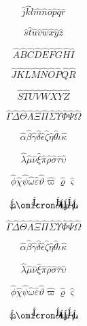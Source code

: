 $$
\hat{j} 
\hat{k} 
\hat{l} 
\hat{m} 
\hat{n} 
\hat{o} 
\hat{p} 
\hat{q} 
\hat{r} 
$$

$$
\hat{s} 
\hat{t} 
\hat{u} 
\hat{v} 
\hat{w} 
\hat{x} 
\hat{y} 
\hat{z} 
$$

$$
\hat{A} 
\hat{B} 
\hat{C} 
\hat{D} 
\hat{E} 
\hat{F} 
\hat{G} 
\hat{H} 
\hat{I} 
$$

$$
\hat{J} 
\hat{K} 
\hat{L} 
\hat{M} 
\hat{N} 
\hat{O} 
\hat{P} 
\hat{Q} 
\hat{R} 
$$

$$
\hat{S} 
\hat{T} 
\hat{U} 
\hat{V} 
\hat{W} 
\hat{X} 
\hat{Y} 
\hat{Z} 
$$



$$
\hat{\varGamma} 
\hat{\varDelta} 
\hat{\varTheta} 
\hat{\varLambda} 
\hat{\varXi} 
\hat{\varPi} 
\hat{\varSigma} 
\hat{\varUpsilon} 
\hat{\varPhi} 
\hat{\varPsi} 
\hat{\varOmega} 
$$

$$
\hat{\alpha} 
\hat{\beta} 
\hat{\gamma} 
\hat{\delta} 
\hat{\epsilon} 
\hat{\zeta} 
\hat{\eta} 
\hat{\theta} 
\hat{\iota} 
\hat{\kappa} 
$$

$$
\hat{\lambda} 
\hat{\mu} 
\hat{\nu} 
\hat{\xi} 
\hat{\pi} 
\hat{\rho} 
\hat{\sigma} 
\hat{\tau} 
\hat{\upsilon} 
$$

$$
\hat{\phi} 
\hat{\chi} 
\hat{\psi} 
\hat{\omega} 
\hat{\varepsilon} 
\hat{\vartheta} 
\hat{\varpi} 
\hat{\varrho} 
\hat{\varsigma} 
$$

$$
\hat{\varphi} 
\hat{\omicron} 
\hat{\partial} 
\hat{\imath} 
\hat{\jmath} 
\hat{\ell} 
\hat{\wp} 
$$

$$
\hat{\varGamma} 
\hat{\varDelta} 
\hat{\varTheta} 
\hat{\varLambda} 
\hat{\varXi} 
\hat{\varPi} 
\hat{\varSigma} 
\hat{\varUpsilon} 
\hat{\varPhi} 
\hat{\varPsi} 
\hat{\varOmega} 
$$

$$
\hat{\alpha} 
\hat{\beta} 
\hat{\gamma} 
\hat{\delta} 
\hat{\epsilon} 
\hat{\zeta} 
\hat{\eta} 
\hat{\theta} 
\hat{\iota} 
\hat{\kappa} 
$$

$$
\hat{\lambda} 
\hat{\mu} 
\hat{\nu} 
\hat{\xi} 
\hat{\pi} 
\hat{\rho} 
\hat{\sigma} 
\hat{\tau} 
\hat{\upsilon} 
$$

$$
\hat{\phi} 
\hat{\chi} 
\hat{\psi} 
\hat{\omega} 
\hat{\varepsilon} 
\hat{\vartheta} 
\hat{\varpi} 
\hat{\varrho} 
\hat{\varsigma} 
$$

$$
\hat{\varphi} 
\hat{\omicron} 
\hat{\partial} 
\hat{\imath} 
\hat{\jmath} 
\hat{\ell} 
\hat{\wp} 
$$




